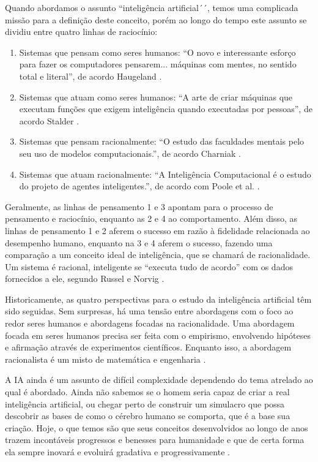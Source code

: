 Quando abordamos o assunto ``inteligência artificial´´, temos uma complicada missão para a definição deste conceito, porém ao longo do tempo este assunto se dividiu entre quatro linhas de raciocínio:

\begin{enumerate}
    \item Sistemas que pensam como seres humanos: ``O novo e interessante esforço para fazer os computadores pensarem... máquinas com mentes, no sentido total e literal”, de acordo Haugeland \cite{haugeland}.
    \item Sistemas que atuam como seres humanos: ``A arte de criar máquinas que executam funções que exigem inteligência quando executadas por pessoas”, de acordo Stalder \cite{stalder}.
    \item Sistemas que pensam racionalmente: ``O estudo das faculdades mentais pelo seu uso de modelos computacionais.”, de acordo Charniak \cite{charniak}.
    \item Sistemas que atuam racionalmente: ``A Inteligência Computacional é o estudo do projeto de agentes inteligentes.”, de acordo com Poole et al. \cite{Poole}.
\end{enumerate}

Geralmente, as linhas de pensamento 1 e 3 apontam para o processo de pensamento e raciocínio, enquanto as 2 e 4 ao comportamento. Além disso, as linhas de pensamento 1 e 2 aferem o sucesso em razão à fidelidade relacionada ao desempenho humano, enquanto na 3 e 4 aferem o sucesso, fazendo uma comparação a um conceito ideal de inteligência, que se chamará de racionalidade. Um sistema é racional, inteligente se ``executa tudo de acordo” com os dados fornecidos a ele, segundo Russel e Norvig \cite{russelnorvig}.

Historicamente, as quatro perspectivas para o estudo da inteligência artificial têm sido seguidas. Sem surpresas, há uma tensão entre abordagens com o foco ao redor seres humanos e abordagens focadas na racionalidade. Uma abordagem focada em seres humanos precisa ser feita com o empirismo, envolvendo hipóteses e afirmação através de experimentos científicos. Enquanto isso, a abordagem racionalista é um misto de matemática e engenharia \cite{russelnorvig}.

A \acrshort{IA} ainda é um assunto de difícil complexidade dependendo do tema atrelado ao qual é abordado. Ainda não sabemos se o homem seria capaz de criar a real inteligência artificial, ou chegar perto de construir um simulacro que possa descobrir as bases de como o cérebro humano se comporta, que é a base sua criação. Hoje, o que temos são que seus conceitos desenvolvidos ao longo de anos trazem incontáveis progressos e benesses para humanidade e que de certa forma ela sempre inovará e evoluirá gradativa e progressivamente \cite{reynoldsstair}.

